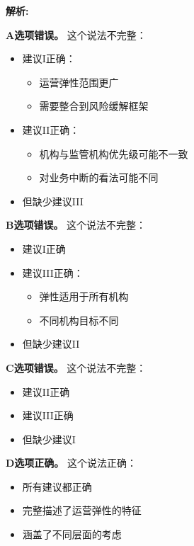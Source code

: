 \documentclass{article}
\newenvironment{explanation}
{\textbf{解析:}\par}
{\par}
\begin{document}
\begin{explanation}
    \textbf{A选项错误。}
    这个说法不完整：
    \begin{itemize}
        \item 建议I正确：
        \begin{itemize}
            \item 运营弹性范围更广
            \item 需要整合到风险缓解框架
        \end{itemize}
        \item 建议II正确：
        \begin{itemize}
            \item 机构与监管机构优先级可能不一致
            \item 对业务中断的看法可能不同
        \end{itemize}
        \item 但缺少建议III
    \end{itemize}

    \textbf{B选项错误。}
    这个说法不完整：
    \begin{itemize}
        \item 建议I正确
        \item 建议III正确：
        \begin{itemize}
            \item 弹性适用于所有机构
            \item 不同机构目标不同
        \end{itemize}
        \item 但缺少建议II
    \end{itemize}

    \textbf{C选项错误。}
    这个说法不完整：
    \begin{itemize}
        \item 建议II正确
        \item 建议III正确
        \item 但缺少建议I
    \end{itemize}

    \textbf{D选项正确。}
    这个说法正确：
    \begin{itemize}
        \item 所有建议都正确
        \item 完整描述了运营弹性的特征
        \item 涵盖了不同层面的考虑
    \end{itemize}
\end{explanation}
\end{document}
